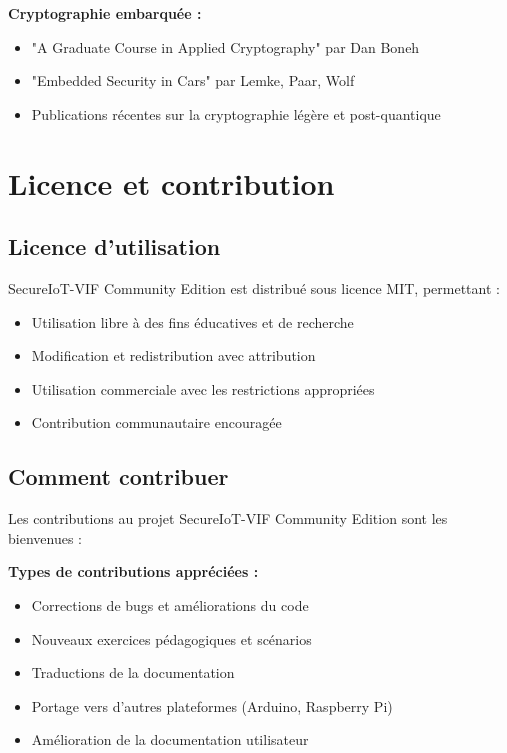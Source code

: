 \textbf{Cryptographie embarquée :}
\begin{itemize}
    \item "A Graduate Course in Applied Cryptography" par Dan Boneh
    \item "Embedded Security in Cars" par Lemke, Paar, Wolf
    \item Publications récentes sur la cryptographie légère et post-quantique
\end{itemize}

\section{Licence et contribution}
\label{app:license}

\subsection{Licence d'utilisation}

SecureIoT-VIF Community Edition est distribué sous licence MIT, permettant :
\begin{itemize}
    \item Utilisation libre à des fins éducatives et de recherche
    \item Modification et redistribution avec attribution
    \item Utilisation commerciale avec les restrictions appropriées
    \item Contribution communautaire encouragée
\end{itemize}

\subsection{Comment contribuer}

Les contributions au projet SecureIoT-VIF Community Edition sont les bienvenues :

\textbf{Types de contributions appréciées :}
\begin{itemize}
    \item Corrections de bugs et améliorations du code
    \item Nouveaux exercices pédagogiques et scénarios
    \item Traductions de la documentation
    \item Portage vers d'autres plateformes (Arduino, Raspberry Pi)
    \item Amélioration de la documentation utilisateur
\end{itemize}


